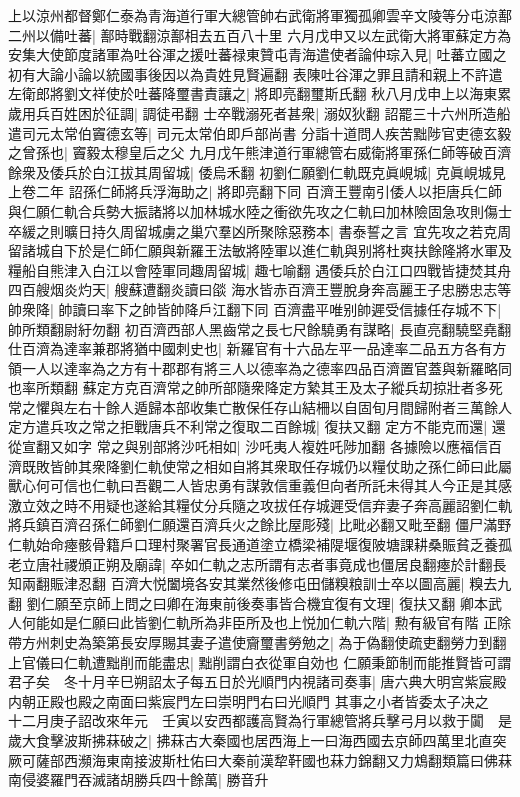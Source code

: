 上以涼州都督鄭仁泰為青海道行軍大總管帥右武衛將軍獨孤卿雲辛文陵等分屯涼鄯二州以備吐蕃|{
	鄯時戰翻涼鄯相去五百八十里}
六月戊申又以左武衛大將軍蘇定方為安集大使節度諸軍為吐谷渾之援吐蕃禄東贊屯青海遣使者論仲琮入見|{
	吐蕃立國之初有大論小論以統國事後因以為貴姓見賢遍翻}
表陳吐谷渾之罪且請和親上不許遣左衛郎將劉文祥使於吐蕃降璽書責讓之|{
	將即亮翻璽斯氏翻}
秋八月戊申上以海東累歲用兵百姓困於征調|{
	調徒弔翻}
士卒戰溺死者甚衆|{
	溺奴狄翻}
詔罷三十六州所造船遣司元太常伯竇德玄等|{
	司元太常伯即戶部尚書}
分詣十道問人疾苦黜陟官吏德玄毅之曾孫也|{
	竇毅太穆皇后之父}
九月戊午熊津道行軍總管右威衛將軍孫仁師等破百濟餘衆及倭兵於白江拔其周留城|{
	倭烏禾翻}
初劉仁願劉仁軌既克眞峴城|{
	克眞峴城見上卷二年}
詔孫仁師將兵浮海助之|{
	將即亮翻下同}
百濟王豐南引倭人以拒唐兵仁師與仁願仁軌合兵勢大振諸將以加林城水陸之衝欲先攻之仁軌曰加林險固急攻則傷士卒緩之則曠日持久周留城虜之巢穴羣凶所聚除惡務本|{
	書泰誓之言}
宜先攻之若克周留諸城自下於是仁師仁願與新羅王法敏將陸軍以進仁軌與别將杜爽扶餘隆將水軍及糧船自熊津入白江以會陸軍同趣周留城|{
	趣七喻翻}
遇倭兵於白江口四戰皆捷焚其舟四百艘烟炎灼天|{
	艘蘇遭翻炎讀曰燄}
海水皆赤百濟王豐脫身奔高麗王子忠勝忠志等帥衆降|{
	帥讀曰率下之帥皆帥降戶江翻下同}
百濟盡平唯别帥遲受信據任存城不下|{
	帥所類翻尉紆勿翻}
初百濟西部人黑齒常之長七尺餘驍勇有謀略|{
	長直亮翻驍堅堯翻}
仕百濟為達率兼郡將猶中國刺史也|{
	新羅官有十六品左平一品達率二品五方各有方領一人以達率為之方有十郡郡有將三人以德率為之德率四品百濟置官蓋與新羅略同也率所類翻}
蘇定方克百濟常之帥所部隨衆降定方縶其王及太子縱兵刧掠壯者多死常之懼與左右十餘人遁歸本部收集亡散保任存山結柵以自固旬月間歸附者三萬餘人定方遣兵攻之常之拒戰唐兵不利常之復取二百餘城|{
	復扶又翻}
定方不能克而還|{
	還從宣翻又如字}
常之與别部將沙吒相如|{
	沙吒夷人複姓吒陟加翻}
各據險以應福信百濟既敗皆帥其衆降劉仁軌使常之相如自將其衆取任存城仍以糧仗助之孫仁師曰此屬獸心何可信也仁軌曰吾觀二人皆忠勇有謀敦信重義但向者所託未得其人今正是其感激立效之時不用疑也遂給其糧仗分兵隨之攻拔任存城遲受信弃妻子奔高麗詔劉仁軌將兵鎮百濟召孫仁師劉仁願還百濟兵火之餘比屋彫殘|{
	比毗必翻又毗至翻}
僵尸滿野仁軌始命瘞骸骨籍戶口理村聚署官長通道塗立橋梁補隄堰復陂塘課耕桑賑貧乏養孤老立唐社禝頒正朔及廟諱|{
	卒如仁軌之志所謂有志者事竟成也僵居良翻瘞於計翻長知兩翻賑津忍翻}
百濟大悦闔境各安其業然後修屯田儲糗粮訓士卒以圖高麗|{
	糗去九翻}
劉仁願至京師上問之曰卿在海東前後奏事皆合機宜復有文理|{
	復扶又翻}
卿本武人何能如是仁願曰此皆劉仁軌所為非臣所及也上悦加仁軌六階|{
	勲有級官有階}
正除帶方州刺史為築第長安厚賜其妻子遣使齎璽書勞勉之|{
	為于偽翻使疏吏翻勞力到翻}
上官儀曰仁軌遭黜削而能盡忠|{
	黜削謂白衣從軍自効也}
仁願秉節制而能推賢皆可謂君子矣　冬十月辛巳朔詔太子每五日於光順門内視諸司奏事|{
	唐六典大明宫紫宸殿内朝正殿也殿之南面曰紫宸門左曰崇明門右曰光順門}
其事之小者皆委太子决之　十二月庚子詔改來年元　壬寅以安西都護高賢為行軍總管將兵擊弓月以救于闐　是歲大食擊波斯拂菻破之|{
	拂菻古大秦國也居西海上一曰海西國去京師四萬里北直突厥可薩部西瀕海東南接波斯杜佑曰大秦前漢犂靬國也菻力錦翻又力鴆翻類篇曰佛菻}
南侵婆羅門吞滅諸胡勝兵四十餘萬|{
	勝音升}


